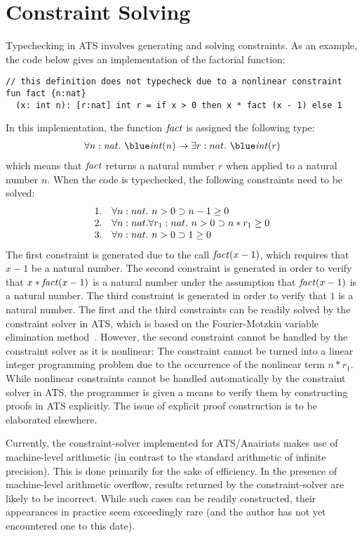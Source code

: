 \section{Constraint Solving}
Typechecking in ATS involves generating and solving constraints.  As an
example, the code below gives an implementation of the factorial function:
\begin{verbatim}
// this definition does not typecheck due to a nonlinear constraint
fun fact {n:nat}
  (x: int n): [r:nat] int r = if x > 0 then x * fact (x - 1) else 1
\end{verbatim}
In this implementation, the function ${\it fact}$ is assigned the
following type:
\[\begin{array}{l}
\forall n:\snat.~\tint(n)\timp\exists r:nat.~\tint(r)
\end{array}\]
which means that ${\it fact}$ returns a natural number $r$ when applied to
a natural number $n$. When the code is typechecked, the following
constraints need to be solved:
\[\begin{array}{ll}
1. & \forall n:nat.~n > 0 \supset n - 1 \geq 0 \\
2. & \forall n:nat.\forall r_1:nat.~n > 0 \supset n * r_1 \geq 0 \\
3. & \forall n:nat.~n > 0 \supset 1 \geq 0 \\
\end{array}\]
The first constraint is generated due to the call ${\it fact} (x-1)$, which
requires that $x-1$ be a natural number. The second constraint is generated
in order to verify that $x * {\it fact} (x-1)$ is a natural number under
the assumption that ${\it fact} (x-1)$ is a natural number.  The third
constraint is generated in order to verify that $1$ is a natural number.
The first and the third constraints can be readily solved by the constraint
solver in ATS, which is based on the Fourier-Motzkin variable elimination
method~\cite{DE73}. However, the second constraint cannot be handled by the
constraint solver as it is nonlinear: The constraint cannot be turned into
a linear integer programming problem due to the occurrence of the nonlinear
term $n*r_1$.  While nonlinear constraints cannot be handled automatically
by the constraint solver in ATS, the programmer is given a means to verify
them by constructing proofs in ATS explicitly. The issue of explicit proof
construction is to be elaborated elsewhere.

Currently, the constraint-solver implemented for ATS/Anairiats makes use of
machine-level arithmetic (in contrast to the standard arithmetic of
infinite precision). This is done primarily for the sake of efficiency. In
the presence of machine-level arithmetic overflow, results returned by the
constraint-solver are likely to be incorrect. While such cases can be readily
constructed, their appearances in practice seem exceedingly rare (and the
author has not yet encountered one to this date).

